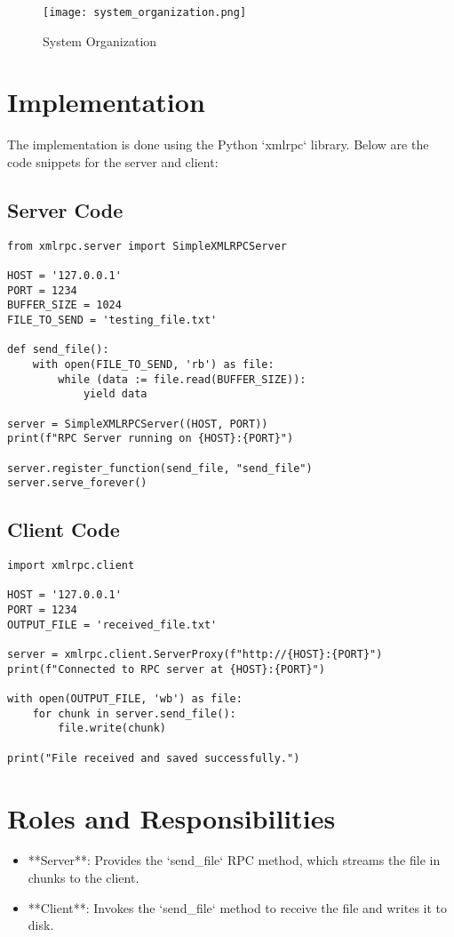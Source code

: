 \documentclass[a4paper,12pt]{article}
\begin{document}
\begin{figure}[h!]
    \centering
    \texttt{[image: system\_organization.png]}
    \caption{System Organization}
    \label{fig:system_organization}
\end{figure}

\section*{Implementation}
The implementation is done using the Python `xmlrpc` library. Below are the code snippets for the server and client:

\subsection*{Server Code}
\begin{lstlisting}
from xmlrpc.server import SimpleXMLRPCServer

HOST = '127.0.0.1'
PORT = 1234
BUFFER_SIZE = 1024
FILE_TO_SEND = 'testing_file.txt'

def send_file():
    with open(FILE_TO_SEND, 'rb') as file:
        while (data := file.read(BUFFER_SIZE)):
            yield data

server = SimpleXMLRPCServer((HOST, PORT))
print(f"RPC Server running on {HOST}:{PORT}")

server.register_function(send_file, "send_file")
server.serve_forever()
\end{lstlisting}

\subsection*{Client Code}
\begin{lstlisting}
import xmlrpc.client

HOST = '127.0.0.1'
PORT = 1234
OUTPUT_FILE = 'received_file.txt'

server = xmlrpc.client.ServerProxy(f"http://{HOST}:{PORT}")
print(f"Connected to RPC server at {HOST}:{PORT}")

with open(OUTPUT_FILE, 'wb') as file:
    for chunk in server.send_file():
        file.write(chunk)

print("File received and saved successfully.")
\end{lstlisting}

\section*{Roles and Responsibilities}
\begin{itemize}
    \item **Server**: Provides the `send_file` RPC method, which streams the file in chunks to the client.
    \item **Client**: Invokes the `send_file` method to receive the file and writes it to disk.
\end{itemize}
\end{document}
